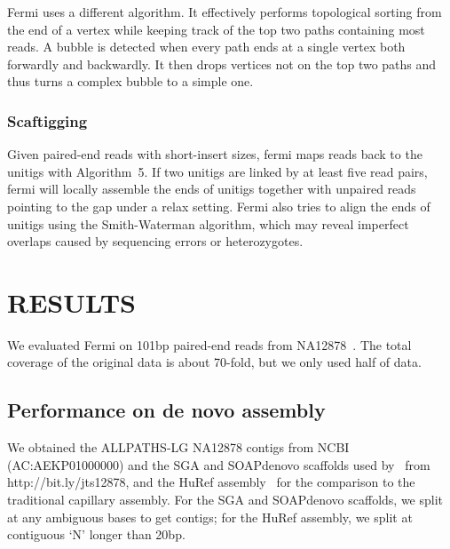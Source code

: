 \documentclass{bioinfo}
\begin{document}
\begin{methods}
Fermi uses a different algorithm. It effectively performs topological sorting
from the end of a vertex while keeping track of the top two paths containing
most reads. A bubble is detected when every path ends at a single vertex both
forwardly and backwardly. It then drops vertices not on the top two paths and
thus turns a complex bubble to a simple one.

\subsubsection{Scaftigging}
Given paired-end reads with short-insert sizes, fermi maps reads back to the
unitigs with Algorithm~5. If two unitigs are linked by at least five read
pairs, fermi will locally assemble the ends of unitigs together with unpaired
reads pointing to the gap under a relax setting. Fermi also tries to align the
ends of unitigs using the Smith-Waterman algorithm, which may reveal imperfect
overlaps caused by sequencing errors or heterozygotes.

\end{methods}

\section{RESULTS}

We evaluated Fermi on 101bp paired-end reads from NA12878~\citep{Depristo:2011vn}.
The total coverage of the original data is about 70-fold, but we only used half
of data.

\subsection{Performance on de novo assembly}
We obtained the ALLPATHS-LG NA12878 contigs from NCBI (AC:AEKP01000000) and the
SGA and SOAPdenovo scaffolds used by~\citet{Simpson:2011ly} from
\mbox{http://bit.ly/jts12878}, and the HuRef assembly~\citep{Levy:2007uq} for
the comparison to the traditional capillary assembly. For the SGA and
SOAPdenovo scaffolds, we split at any ambiguous bases to get contigs; for the
HuRef assembly, we split at contiguous `N' longer than 20bp.
\end{document}
